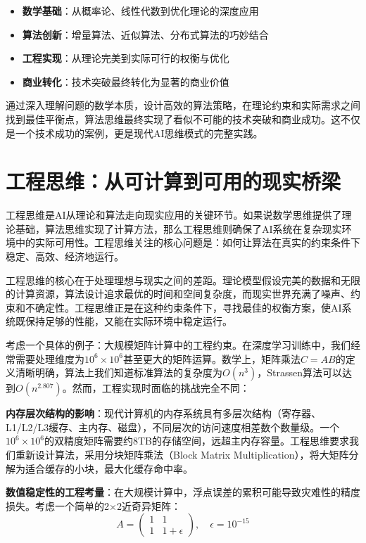 \begin{itemize}
\item \textbf{数学基础}：从概率论、线性代数到优化理论的深度应用
\item \textbf{算法创新}：增量算法、近似算法、分布式算法的巧妙结合
\item \textbf{工程实现}：从理论完美到实际可行的权衡与优化
\item \textbf{商业转化}：技术突破最终转化为显著的商业价值
\end{itemize}

通过深入理解问题的数学本质，设计高效的算法策略，在理论约束和实际需求之间找到最佳平衡点，算法思维最终实现了看似不可能的技术突破和商业成功。这不仅是一个技术成功的案例，更是现代AI思维模式的完整实践。

\section{工程思维：从可计算到可用的现实桥梁}

工程思维是AI从理论和算法走向现实应用的关键环节。如果说数学思维提供了理论基础，算法思维实现了计算方法，那么工程思维则确保了AI系统在复杂现实环境中的实际可用性。工程思维关注的核心问题是：如何让算法在真实的约束条件下稳定、高效、经济地运行。

工程思维的核心在于处理理想与现实之间的差距。理论模型假设完美的数据和无限的计算资源，算法设计追求最优的时间和空间复杂度，而现实世界充满了噪声、约束和不确定性。工程思维正是在这种约束条件下，寻找最佳的权衡方案，使AI系统既保持足够的性能，又能在实际环境中稳定运行。

考虑一个具体的例子：大规模矩阵计算中的工程约束。在深度学习训练中，我们经常需要处理维度为$10^6 \times 10^6$甚至更大的矩阵运算。数学上，矩阵乘法$C = AB$的定义清晰明确，算法上我们知道标准算法的复杂度为$O(n^3)$，Strassen算法可以达到$O(n^{2.807})$。然而，工程实现时面临的挑战完全不同：

\textbf{内存层次结构的影响}：现代计算机的内存系统具有多层次结构（寄存器、L1/L2/L3缓存、主内存、磁盘），不同层次的访问速度相差数个数量级。一个$10^6 \times 10^6$的双精度矩阵需要约8TB的存储空间，远超主内存容量。工程思维要求我们重新设计算法，采用分块矩阵乘法（Block Matrix Multiplication），将大矩阵分解为适合缓存的小块，最大化缓存命中率。

\textbf{数值稳定性的工程考量}：在大规模计算中，浮点误差的累积可能导致灾难性的精度损失。考虑一个简单的2×2近奇异矩阵：
$$A = \begin{pmatrix} 1 & 1 \\ 1 & 1+\epsilon \end{pmatrix}, \quad \epsilon = 10^{-15}$$

